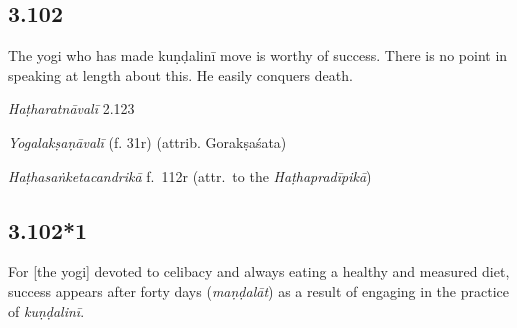 \begin{ekdosis}
\subsection*{3.102}
\begin{translation}[hp03_102]
The yogi who has made kuṇḍalinī move is worthy of success. There is no point in speaking at length about this. He easily conquers death.
\end{translation}


\begin{testimonia}[hp03_102]
\emph{Haṭharatnāvalī} 2.123
\begin{versinnote}
\end{versinnote}

\emph{Yogalakṣaṇāvalī} (f. 31r)  (attrib. Gorakṣaśata)
\begin{versinnote}
\end{versinnote}

\emph{Haṭhasaṅketacandrikā} f.~112r (attr.~to the \emph{Haṭhapradīpikā})
\begin{versinnote}
\end{versinnote}
\end{testimonia}



\subsection*{3.102*1}
\begin{translation}[hp03_102_1]
For [the yogi] devoted to celibacy and always eating a healthy and measured diet, success appears after forty days (\emph{maṇḍalāt}) as a result of engaging in the practice of \emph{kuṇḍalinī}.
\end{translation}


\end{ekdosis}
